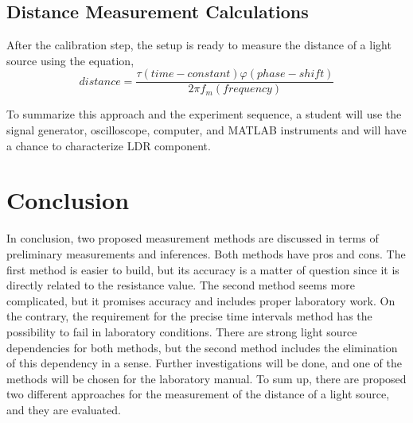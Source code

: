 \documentclass[letterpaper,12pt]{article}
\begin{document}
\subsection{Distance Measurement Calculations}
After the calibration step, the setup is ready to measure the distance of a light source using the equation,
\[distance = \frac{  \tau (time-constant)  \varphi (phase-shift)  }{2 \pi f_m (frequency)}\]

To summarize this approach and the experiment sequence, a student will use the signal generator, oscilloscope, computer, and MATLAB instruments and will have a chance to characterize LDR component. 
\section{Conclusion}
In conclusion, two proposed measurement methods are discussed in terms of preliminary measurements and inferences. Both methods have pros and cons. The first method is easier to build, but its accuracy is a matter of question since it is directly related to the resistance value. The second method seems more complicated, but it promises accuracy and includes proper laboratory work. On the contrary, the requirement for the precise time intervals method has the possibility to fail in laboratory conditions. There are strong light source dependencies for both methods, but the second method includes the elimination of this dependency in a sense. Further investigations will be done, and one of the methods will be chosen for the laboratory manual. To sum up, there are proposed two different approaches for the measurement of the distance of a light source, and they are evaluated.   





\end{document}
